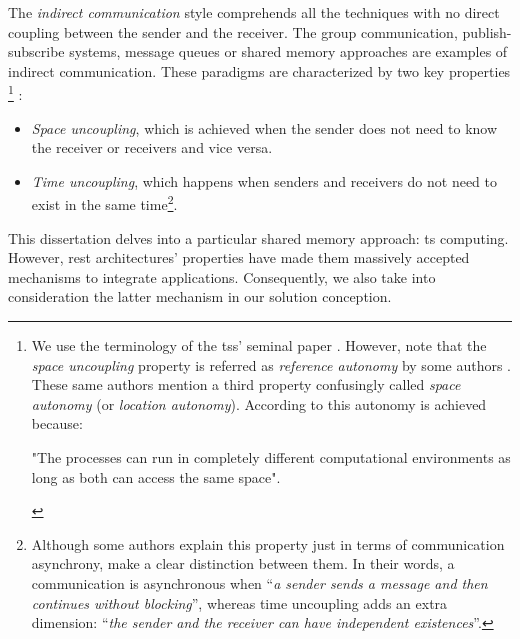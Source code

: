 The \emph{indirect communication} style comprehends all the techniques with no direct coupling between the sender and the receiver.
The group communication, publish-subscribe systems, message queues or shared memory approaches are examples of indirect communication.
These paradigms are characterized by two key properties \citep{gelernter_generative_1985,coulouris_distributed_2012}
\footnote{
  We use the terminology of the  \aclp{ts}' seminal paper \citep{gelernter_generative_1985}. %
  However, note that
  the \emph{space uncoupling} property is referred as \emph{reference autonomy} by some authors \citep{fensel_triple-space_2004}. %
  These same authors mention a third property confusingly called \emph{space autonomy} (or \emph{location autonomy}).
  According to \citet{fensel_triple-space_2004} this autonomy is achieved because:
  \begin{emph} %
  "The processes can run in completely different computational environments as long as both can access the same space".
  \end{emph}
}
:

\begin{itemize}
 \item \emph{Space uncoupling}, which is achieved when the sender does not need to know the receiver or receivers and vice versa.
 \item \emph{Time uncoupling}, which happens when senders and receivers do not need to exist in the same time\footnote{
	  Although some authors \citep{fensel_triple-space_2004,krummenacher_www_2005} explain this property just in terms of communication asynchrony,
	  \citet{coulouris_distributed_2012} make a clear distinction between them.
	  In their words, a communication is asynchronous when ``\emph{a sender sends a message and then continues without blocking}'',
	  whereas time uncoupling adds an extra dimension: ``\emph{the sender and the receiver can have independent existences}''.
	  }.
 
\end{itemize}



This dissertation delves into a particular shared memory approach: \acl{ts} computing. %
However, \ac{rest} architectures' properties have made them massively accepted mechanisms to integrate applications.
Consequently, we also take into consideration the latter mechanism in our solution conception.